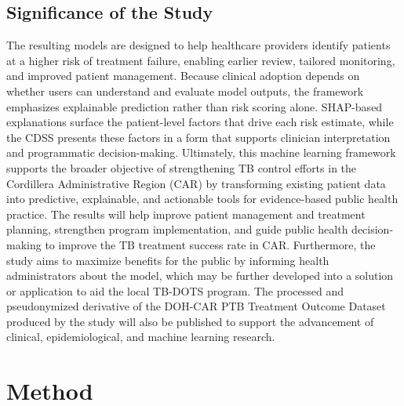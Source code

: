 \documentclass[12pt]{article}
\begin{document}
\subsection{Significance of the Study}

The resulting models are designed to help healthcare providers identify patients at a higher risk of treatment failure, enabling earlier review, tailored monitoring, and improved patient management. Because clinical adoption depends on whether users can understand and evaluate model outputs, the framework emphasizes explainable prediction rather than risk scoring alone. SHAP-based explanations surface the patient-level factors that drive each risk estimate, while the CDSS presents these factors in a form that supports clinician interpretation and programmatic decision-making. Ultimately, this machine learning framework supports the broader objective of strengthening TB control efforts in the Cordillera Administrative Region (CAR) by transforming existing patient data into predictive, explainable, and actionable tools for evidence-based public health practice. The results will help improve patient management and treatment planning, strengthen program implementation, and guide public health decision-making to improve the TB treatment success rate in CAR. Furthermore, the study aims to maximize benefits for the public by informing health administrators about the model, which may be further developed into a solution or application to aid the local TB-DOTS program. The processed and pseudonymized derivative of the DOH-CAR PTB Treatment Outcome Dataset produced by the study will also be published to support the advancement of clinical, epidemiological, and machine learning research.

\section{Method}
\end{document}
